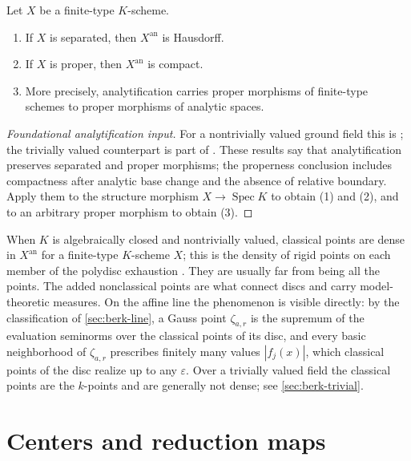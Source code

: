 \begin{theorem}\label{thm:berk-proper-compact}
Let $X$ be a finite-type $K$-scheme.
\begin{enumerate}
\item If $X$ is separated, then $X^{\mathrm{an}}$ is Hausdorff.
\item If $X$ is proper, then $X^{\mathrm{an}}$ is compact.
\item More precisely, analytification carries proper morphisms of finite-type
schemes to proper morphisms of analytic spaces.
\end{enumerate}
\end{theorem}
\begin{proof}[Foundational analytification input]
For a nontrivially valued ground field this is
\cite[Theorem~3.4.8]{Berk12}; the trivially valued counterpart is part of
\cite[Theorem~3.5.1]{Berk12}.  These results say that analytification
preserves separated and proper morphisms; the properness conclusion
includes compactness after analytic base change and the absence of relative
boundary.  Apply them to the structure morphism
$X\to\operatorname{Spec}K$ to obtain (1) and (2), and to an arbitrary
proper morphism to obtain (3).
\end{proof}

\begin{remark}\label{rem:berk-classical-density}
When $K$ is algebraically closed and nontrivially valued, classical points
are dense in $X^{\mathrm{an}}$ for a finite-type $K$-scheme $X$; this
is the density of rigid points on each member of the polydisc exhaustion
\cite[Proposition~2.1.15]{Berk12}. They
are usually far from being all the points. The added nonclassical points are
what connect discs and carry model-theoretic measures.  On the affine line
the phenomenon is visible directly: by the classification of
\cref{sec:berk-line}, a Gauss point $\zeta_{a,r}$ is the supremum of the
evaluation seminorms over the classical points of its disc, and every
basic neighborhood of $\zeta_{a,r}$ prescribes finitely many values
$|f_j(x)|$, which classical points of the disc realize up to any
$\varepsilon$.  Over a trivially valued field the classical points are
the $k$-points and are generally not dense; see
\cref{sec:berk-trivial}.
\end{remark}

\section{Centers and reduction maps}
\label{sec:berk-reduction}

